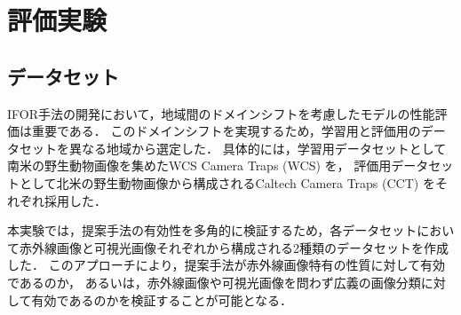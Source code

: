 
\chapter{評価実験}

\section{データセット}

IFOR手法の開発において，地域間のドメインシフトを考慮したモデルの性能評価は重要である．
このドメインシフトを実現するため，学習用と評価用のデータセットを異なる地域から選定した．
具体的には，学習用データセットとして南米の野生動物画像を集めたWCS Camera Traps (WCS) \cite{wcs}を，
評価用データセットとして北米の野生動物画像から構成されるCaltech Camera Traps (CCT) \cite{cct}をそれぞれ採用した．

本実験では，提案手法の有効性を多角的に検証するため，各データセットにおいて赤外線画像と可視光画像それぞれから構成される2種類のデータセットを作成した．
このアプローチにより，提案手法が赤外線画像特有の性質に対して有効であるのか，
あるいは，赤外線画像や可視光画像を問わず広義の画像分類に対して有効であるのかを検証することが可能となる．

